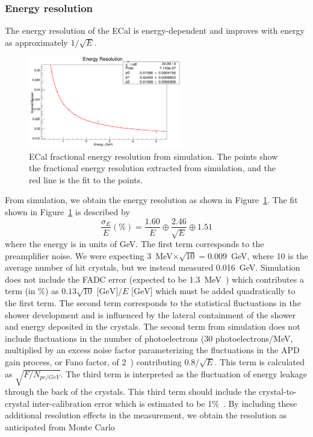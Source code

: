 \subsubsection{Energy resolution}

The energy resolution of the ECal is energy-dependent and improves with energy as approximately $1/\sqrt{E}$. 
\begin{figure}[htb]
  \centering
      \includegraphics[width=0.6\textwidth]{pics/performance/eResFitMC.png}
  \caption[ECal fractional energy resolution fitted from simulation]{ECal fractional energy resolution from simulation. The points show the fractional energy resolution extracted from simulation, and the red line is the fit to the points.}
  \label{Figure:eResFitMC}
\end{figure}
From simulation, we obtain the energy resolution as shown in Figure~\ref{Figure:eResFitMC}. The fit shown in Figure~\ref{Figure:eResFitMC} is described by
\begin{equation}
\label{eq:eResMC}
\dfrac{\sigma_E}{E} (\%) = \dfrac{1.60}{E} \oplus \dfrac{2.46}{\sqrt{E}} \oplus 1.51
\end{equation}
where the energy is in units of GeV. The first term corresponds to the preamplifier noise. We were expecting 3~MeV$\times \sqrt{10} = 0.009$~GeV, where 10 is the average number of hit crystals, but we instead measured 0.016~GeV. Simulation does not include the FADC error (expected to be 1.3~MeV~\cite{charles_2014}) which contributes a term (in $\%$) as $0.13\sqrt{10}\textrm{ [GeV]}/E\textrm{ [GeV]}$ which must be added quadratically to the first term. The second term corresponds to the statistical fluctuations in the shower development and is influenced by the lateral containment of the shower and energy deposited in the crystals. The second term from simulation does not include fluctuations in the number of photoelectrons (30 photoelectrons/MeV, multiplied by an excess noise factor parameterizing the fluctuations in the APD gain process, or Fano factor, of 2~\cite{panda_2008}) contributing $0.8/\sqrt{E}$. This term is calculated as $\sqrt{F/N_{pe/GeV}}$. The third term is interpreted as the fluctuation of energy leakage through the back of the crystals. This third term should include the crystal-to-crystal inter-calibration error which is estimated to be 1$\%$~\cite{szumila-vance_hps_ecal_2014}. By including these additional resolution effects in the measurement, we obtain the resolution as anticipated from Monte Carlo

